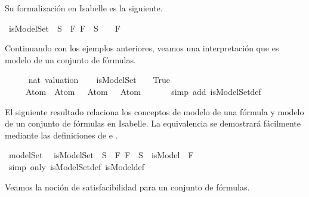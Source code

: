 \begin{isabellebody}
\begin{isamarkuptext}
  Su formalización en Isabelle es la siguiente.%
\end{isamarkuptext}\isamarkuptrue%
\isamarkupfalse%
\ {\isachardoublequoteopen}isModelSet\ {\isasymA}\ S\ {\isasymequiv}\ {\isasymforall}F{\isachardot}\ {\isacharparenleft}F\ {\isasymin}\ S\ {\isasymlongrightarrow}\ {\isasymA}\ {\isasymTurnstile}\ F{\isacharparenright}{\isachardoublequoteclose}%
\begin{isamarkuptext}%
Continuando con los ejemplos anteriores, veamos una interpretación
  que es modelo de un conjunto de fórmulas.%
\end{isamarkuptext}\isamarkuptrue%
\isamarkupfalse%
\isanewline
{}\isanewline
%
\isadelimproof
\ \ %
\endisadelimproof
%
\isatagproof
{}\isamarkupfalse%
\ {\isasymA}\ {\isacharcolon}{\isacharcolon}\ {\isachardoublequoteopen}nat\ valuation{\isachardoublequoteclose}\isanewline
\isanewline
\ \ \isamarkupfalse%
\ {\isachardoublequoteopen}isModelSet\ {\isacharparenleft}{\isasymA}\ {\isacharparenleft}{}\ {\isacharcolon}{\isacharequal}\ True{\isacharparenright}{\isacharparenright}\isanewline
\ \ \ \ \ {\isacharbraceleft}Atom\ {}{\isacharcomma}\ {\isacharparenleft}Atom\ {}\ \isactrlbold {\isasymand}\ Atom\ {}{\isacharparenright}\ \isactrlbold {\isasymrightarrow}\ Atom\ {}{\isacharbraceright}{\isachardoublequoteclose}\isanewline
\ \ \ \ \isamarkupfalse%
\ {\isacharparenleft}simp\ add{\isacharcolon}\ isModelSet{\isacharunderscore}def{\isacharparenright}%
\endisatagproof
{\isafoldproof}%
%
\isadelimproof
\isanewline
%
\endisadelimproof
\isanewline
{}\isamarkupfalse%
%
\begin{isamarkuptext}%
El siguiente resultado relaciona los conceptos de modelo de 
  una fórmula y modelo de un conjunto de fórmulas en Isabelle.
  La equivalencia se demostrará fácilmente mediante las definiciones
  de  e .%
\end{isamarkuptext}\isamarkuptrue%
\isamarkupfalse%
\ modelSet{\isacharcolon}\isanewline
\ \ {\isachardoublequoteopen}isModelSet\ {\isasymA}\ S\ {\isasymequiv}\ {\isasymforall}F{\isachardot}\ {\isacharparenleft}F\ {\isasymin}\ S\ {\isasymlongrightarrow}\ isModel\ {\isasymA}\ F{\isacharparenright}{\isachardoublequoteclose}\ \isanewline
%
\isadelimproof
\ \ %
\endisadelimproof
%
\isatagproof
{}\isamarkupfalse%
\ {\isacharparenleft}simp\ only{\isacharcolon}\ isModelSet{\isacharunderscore}def\ isModel{\isacharunderscore}def{\isacharparenright}%
\endisatagproof
{\isafoldproof}%
%
\isadelimproof
%
\endisadelimproof
%
\begin{isamarkuptext}%
Veamos la noción de satisfacibilidad para un conjunto de fórmulas.


\end{isamarkuptext}
\end{isabellebody}
